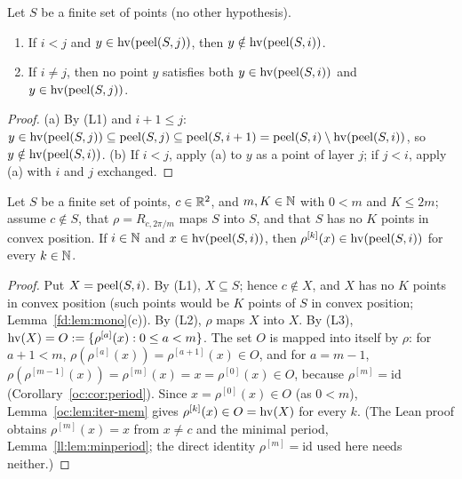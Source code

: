 \begin{lemma}\label{oc:lem:disjoint}
Let $S$ be a finite set of points (no other hypothesis).
\begin{enumerate}[label=(\alph*)]
\item If $i<j$ and $y\in\operatorname{hv}(\operatorname{peel}(S,j))$, then $y\notin\operatorname{hv}(\operatorname{peel}(S,i))$.
\item If $i\ne j$, then no point $y$ satisfies both $y\in\operatorname{hv}(\operatorname{peel}(S,i))$ and $y\in\operatorname{hv}(\operatorname{peel}(S,j))$.
\end{enumerate}
\end{lemma}
\begin{proof}
(a) By (L1) and $i+1\le j$: $y\in\operatorname{hv}(\operatorname{peel}(S,j))\subseteq\operatorname{peel}(S,j)\subseteq\operatorname{peel}(S,i+1)
=\operatorname{peel}(S,i)\setminus\operatorname{hv}(\operatorname{peel}(S,i))$, so $y\notin\operatorname{hv}(\operatorname{peel}(S,i))$. (b) If $i<j$, apply (a) to $y$ as a
point of layer $j$; if $j<i$, apply (a) with $i$ and $j$ exchanged.
\end{proof}

\begin{lemma}\label{oc:lem:closed}
Let $S$ be a finite set of points, $c\in\mathbb R^2$, and $m,K\in\mathbb N$ with $0<m$ and $K\le2m$; assume $c\notin S$,
that $\rho=R_{c,2\pi/m}$ maps $S$ into $S$, and that $S$ has no $K$ points in convex position. If
$i\in\mathbb N$ and $x\in\operatorname{hv}(\operatorname{peel}(S,i))$, then $\rho^{[k]}(x)\in\operatorname{hv}(\operatorname{peel}(S,i))$ for every $k\in\mathbb N$.
\end{lemma}
\begin{proof}
Put $X=\operatorname{peel}(S,i)$. By (L1), $X\subseteq S$; hence $c\notin X$, and $X$ has no $K$ points in convex
position (such points would be $K$ points of $S$ in convex position; Lemma~\ref{fd:lem:mono}(c)). By (L2),
$\rho$ maps $X$ into $X$. By (L3), $\operatorname{hv}(X)=O:=\{\rho^{[a]}(x):0\le a<m\}$. The set $O$ is mapped into
itself by $\rho$: for $a+1<m$, $\rho(\rho^{[a]}(x))=\rho^{[a+1]}(x)\in O$, and for $a=m-1$,
$\rho(\rho^{[m-1]}(x))=\rho^{[m]}(x)=x=\rho^{[0]}(x)\in O$, because $\rho^{[m]}=\mathrm{id}$
(Corollary~\ref{oc:cor:period}). Since $x=\rho^{[0]}(x)\in O$ (as $0<m$), Lemma~\ref{oc:lem:iter-mem}
gives $\rho^{[k]}(x)\in O=\operatorname{hv}(X)$ for every $k$. (The Lean proof obtains $\rho^{[m]}(x)=x$ from
$x\ne c$ and the minimal period, Lemma~\ref{ll:lem:minperiod}; the direct identity
$\rho^{[m]}=\mathrm{id}$ used here needs neither.)
\end{proof}

